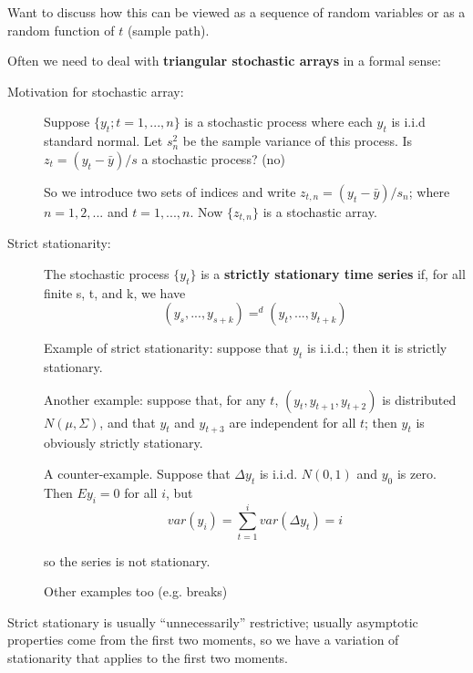 Want to discuss how this can be viewed as a sequence of random
variables or as a random function of $t$ (sample path).

Often we need to deal with \textbf{triangular stochastic arrays} in a
formal sense:

\begin{description}
\item[Motivation for stochastic array:]
  Suppose $\{y_t; t=1,...,n\}$ is a stochastic process where each
  $y_t$ is i.i.d standard normal. Let $s^2_n$ be the sample variance
  of this process. Is $z_t = (y_t - \bar y) / s$ a stochastic process?
  (no)

  So we introduce two sets of indices and write $z_{t,n} = (y_t - \bar
  y) / s_n$; where $n = 1,2,...$ and $t = 1,...,n$.  Now $\{z_{t,n}\}$
  is a stochastic array.
\item[Strict stationarity:]
  The stochastic process $\{y_t\}$ is a \textbf{strictly stationary
    time series} if, for all finite s, t, and k, we have
  \[(y_s,...,y_{s+k}) =^d (y_t,...,y_{t+k})\]

  Example of strict stationarity: suppose that $y_t$ is i.i.d.; then
  it is strictly stationary.

  Another example: suppose that, for any $t$, $(y_t, y_{t+1},
  y_{t+2})$ is distributed $N(μ,Σ)$, and that $y_t$ and $y_{t+3}$ are
  independent for all $t$; then $y_t$ is obviously strictly
  stationary.

  A counter-example. Suppose that $Δy_t$ is i.i.d. $N(0,1)$ and $y_0$
  is zero. Then $E y_i = 0$ for all $i$, but
  \[var(y_i) = \sum_{t=1}^i var(Δy_t) = i\]

  so the series is not stationary.

  Other examples too (e.g. breaks)
\end{description}

Strict stationary is usually ``unnecessarily'' restrictive; usually
asymptotic properties come from the first two moments, so we have a
variation of stationarity that applies to the first two moments.

